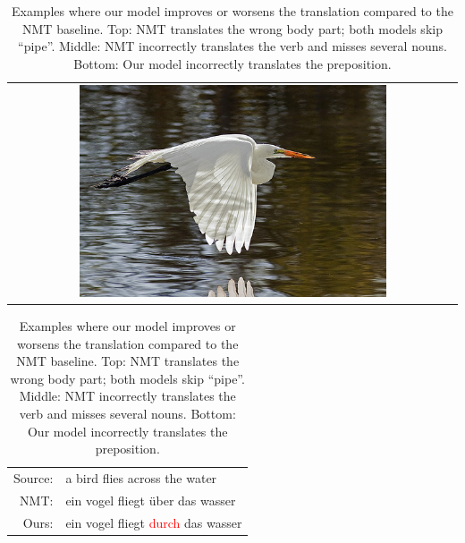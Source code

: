 \begin{table}[h]
\begin{subtable}{0.22\textwidth}
\centering
\begin{tabular}{c}
\includegraphics[width=0.7\textwidth]{chapters/IJCNLP/images/3325578605.jpg}
\end{tabular}
\end{subtable}%
\begin{subtable}{0.75\textwidth}
\begin{tabular}{rp{27em}}
Source: & a bird flies across the water \\
NMT: & ein vogel fliegt über das wasser \\
Ours: & ein vogel fliegt \textcolor{red}{durch} das wasser\\
\end{tabular}
\end{subtable}

\caption{Examples where our model improves or worsens the translation compared to the NMT baseline. Top: NMT translates the wrong body part; both models skip ``pipe''. Middle: NMT incorrectly translates the verb and misses several nouns. Bottom: Our model incorrectly translates the preposition.}\label{tab:results:examples}
\end{table}

